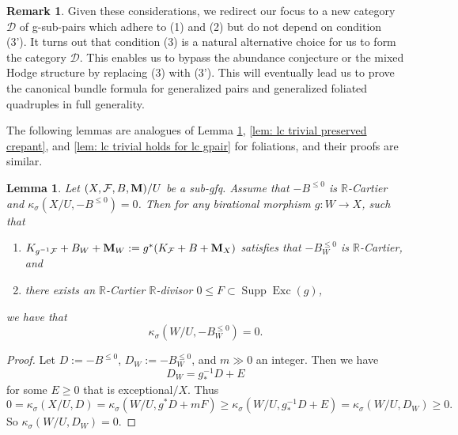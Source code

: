 \documentclass[11pt]{amsart}
\numberwithin{equation}{section}
\newcommand{\Mm}{{\bf{M}}}
\newcommand{\Rr}{\mathbb{R}}
\newcommand{\Exc}{\operatorname{Exc}}
\newcommand{\Supp}{\operatorname{Supp}}
\newcommand{\Ff}{\mathcal{F}}
\newtheorem{lem}[thm]{Lemma}
\theoremstyle{definition}
\theoremstyle{definition}
\newtheorem{rem}[thm]{Remark}
\theoremstyle{definition}
\begin{document}
\begin{rem}
 Given these considerations, we redirect our focus to a new category $\mathcal{D}$ of g-sub-pairs which adhere to (1) and (2) but do not depend on condition (3'). It turns out that condition (3) is a natural alternative choice for us to form the category $\mathcal{D}$. This enables us to bypass the abundance conjecture or the mixed Hodge structure by replacing (3) with (3').  This will eventually lead us to prove the canonical bundle formula for generalized pairs and generalized foliated quadruples in full generality.
\end{rem}


The following lemmas are analogues of Lemma \ref{lem: lc trivial (3) invariant under pullback}, \ref{lem: lc trivial preserved crepant}, and \ref{lem: lc trivial holds for lc gpair} for foliations, and their proofs are similar.

\begin{lem}\label{lem: lc trivial (3) invariant under pullback}
    Let $(X,\Ff,B,\Mm)/U$ be a sub-gfq. Assume that $-B^{\leq 0}$ is $\Rr$-Cartier and $\kappa_{\sigma}(X/U,-B^{\leq 0})=0$. Then for any birational morphism $g: W\rightarrow X$, such that
    \begin{enumerate}
        \item $K_{g^{-1}\Ff}+B_W+\Mm_W:=g^*(K_{\Ff}+B+\Mm_X)$ satisfies that $-B_W^{\leq 0}$ is $\Rr$-Cartier, and
        \item there exists an $\Rr$-Cartier $\Rr$-divisor $0\leq F\subset\Supp\Exc(g)$,
    \end{enumerate}
we have that
$$\kappa_{\sigma}(W/U,-B_W^{\leq 0})=0.$$
\end{lem}
\begin{proof}
Let $D:=-B^{\leq 0}$, $D_W:=-B_W^{\leq 0}$, and $m\gg 0$ an integer. Then we have
$$D_W=g^{-1}_*D+E$$
for some $E\geq 0$ that is exceptional$/X$. Thus
$$0=\kappa_{\sigma}(X/U,D)=\kappa_{\sigma}(W/U,g^*D+mF)\geq\kappa_{\sigma}(W/U,g^{-1}_*D+E)=\kappa_{\sigma}(W/U,D_W)\geq 0.$$
So $\kappa_{\sigma}(W/U,D_W)=0$.
\end{proof}
\end{document}

